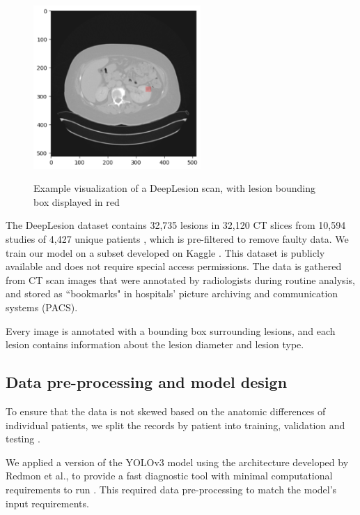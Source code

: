 \begin{figure}
 \begin{center}
 \includegraphics[width=2.5in]{images/example_scan.png}\\
 \caption{Example visualization of a DeepLesion scan, with lesion bounding box displayed in red}\label{example_scan}
 \end{center}
\end{figure}


The DeepLesion dataset contains 32,735 lesions in 32,120 CT slices from 10,594 studies of 4,427 unique patients \cite{deeplesion}, which is pre-filtered to remove faulty data. We train our model on a subset developed on Kaggle \cite{kaggle}. This dataset is publicly available and does not require special access permissions. The data is gathered from CT scan images that were annotated by radiologists during routine analysis, and stored as ``bookmarks" in hospitals' picture archiving and communication systems (PACS).  

Every image is annotated with a bounding box surrounding lesions, and each lesion contains information about the lesion diameter and lesion type. 

\subsection{Data pre-processing and model design}
To ensure that the data is not skewed based on the anatomic differences of individual patients, we split the records by patient into training, validation and testing \cite{chollet_deep_learning}. 

We applied a version of the YOLOv3 model using the architecture developed by Redmon et al., to provide a fast diagnostic tool with minimal computational requirements to run \cite{yolov3}. This required data pre-processing to match the model's input requirements.

